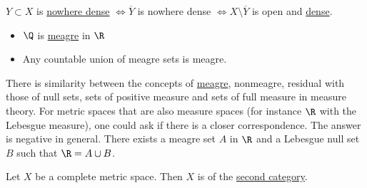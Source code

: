 \documentclass{article}
\renewcommand{\emptyset}{\varnothing}
\DeclareMathOperator{\interior}{int}
\begin{document}

\begin{fact}
    $Y \subset X$ is \hyperlink{def:meagre}{nowhere dense} $\iff \overline{Y}$ is nowhere dense $\iff X \setminus \overline{Y}$ is open and \hyperlink{def:dense}{dense}.
\end{fact}

\begin{eg}
    \leavevmode
    \begin{itemize}
        \item $\Q$ is \hyperlink{def:meagre}{meagre} in $\R$
        \item Any countable union of meagre sets is meagre.
    \end{itemize}
\end{eg}

\begin{remark}
    There is similarity between the concepts of \hyperlink{def:meagre}{meagre}, nonmeagre, residual with those of null sets, sets of positive measure and sets of full measure in measure theory.
    For metric spaces that are also measure spaces (for instance $\R$ with the Lebesgue measure), one could ask if there is a closer correspondence.
    The answer is negative in general.
    There exists a meagre set $A$ in $\R$ and a Lebesgue null set $B$ such that $\R = A \cup B$.
\end{remark}

\begin{cor}
    Let $X$ be a complete metric space. Then $X$ is of the \hyperlink{def:meagre}{second category}.
\end{cor}
\end{document}
